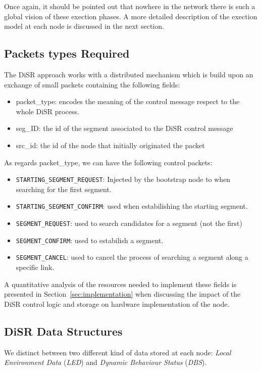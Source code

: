 Once again, it should be pointed out that nowhere in the network there
is such a global vision of these exection phases. A more detailed
description of the exection model at each node is discussed in the
next section.

\subsection{Packets types Required}

The DiSR approach works with a distributed mechanism which is build
upon an exchange of small packets containing the following fields:
\begin{itemize}
\item{packet\_type}: encodes the meaning of the control message respect
to the whole DiSR process.
\item{seg\_ID}: the id of the segment associated to the DiSR control message
\item{src\_id}: the id of the node that initially originated the
packet
\end{itemize}

As regards packet\_type, we can have the following control packets:
\begin{itemize}
\item{\texttt{STARTING\_SEGMENT\_REQUEST}}: Injected by the bootstrap
node to when searching for the first segment. 
\item{\texttt{STARTING\_SEGMENT\_CONFIRM}}: used when estabilishing
the starting  segment. 
\item{\texttt{SEGMENT\_REQUEST}}: used to search candidates for a segment (not the
first)
\item{\texttt{SEGMENT\_CONFIRM}}: used to estabilish a segment. 
\item{\texttt{SEGMENT\_CANCEL}}: used to cancel the process of searching a segment along a
specific link.
\end{itemize}

A quantitative analysis of the resources needed to implement these
fields is presented in Section~\ref{sec:implementation} when
discussing the impact of the DiSR control logic and storage on
hardware implementation of the node.

\subsection{DiSR Data Structures}
\label{ssec:disr_dstruct}

We distinct between two different kind of data stored at each node:
\emph{Local Environment Data} (\emph{LED}) and \emph{Dynamic Behaviour
Status} (\emph{DBS}).

